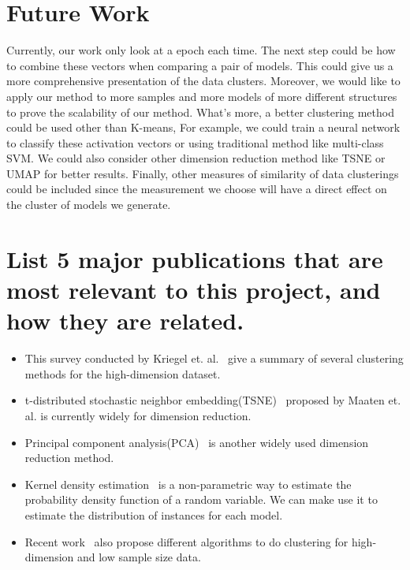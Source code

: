 \documentclass[11pt, twocolumn]{article}
\begin{document}
 
 \section{Future Work}
 Currently, our work only look at a epoch each time. The next step could be how to combine these vectors when comparing a pair of models. 
 This could give us a more comprehensive presentation of the data clusters. Moreover, we would like to apply our method to more samples and more models of more different structures to prove the scalability of our method. What's more, a better clustering method could be used other than K-means, For example, we could train a neural network to classify these activation vectors or using traditional method like multi-class SVM. We could also consider other dimension reduction method like TSNE or UMAP for better results. Finally, other measures of similarity of data clusterings could be included since the measurement we choose will have a direct effect on the cluster of models we generate.
 


\section{List 5 major publications that are most relevant to this project, and how they are related.}

\begin{itemize}
	
\item This survey conducted by Kriegel et. al.~\cite{Kriegel:2009:CHD:1497577.1497578} give a summary of several clustering methods for the high-dimension dataset.

\item t-distributed stochastic neighbor embedding(TSNE)~\cite{vanDerMaaten2008} proposed by Maaten et. al. is currently widely for dimension reduction.

\item Principal component analysis(PCA)~\cite{jolliffe86} is another widely used dimension reduction method.

\item Kernel density estimation~\cite{article} is a non-parametric way to estimate the probability density function of a random variable. We can make use it to estimate the distribution of instances for each model.

\item Recent work~\cite{article2,article3}  also propose different algorithms to do clustering for high-dimension and low sample size data.

 \end{itemize}




%
%
%


%
\end{document}
